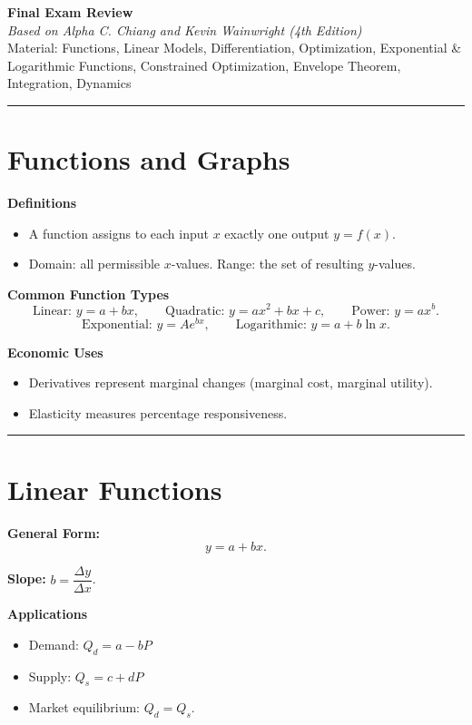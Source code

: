 \documentclass[12pt]{article}
\begin{document}
\begin{center}
    {\LARGE \textbf{Final Exam Review}}\\[4pt]
    \textit{Based on Alpha C. Chiang and Kevin Wainwright (4th Edition)}\\[4pt]
    Material: Functions, Linear Models, Differentiation, Optimization, Exponential \& Logarithmic Functions, Constrained Optimization, Envelope Theorem, Integration, Dynamics
\end{center}

\hrule
\vspace{10pt}

\section*{Functions and Graphs}

\textbf{Definitions}
\begin{itemize}
    \item A function assigns to each input \(x\) exactly one output \(y=f(x)\).
    \item Domain: all permissible \(x\)-values. Range: the set of resulting \(y\)-values.
\end{itemize}

\textbf{Common Function Types}
\[
\text{Linear: }y=a+bx,\qquad
\text{Quadratic: }y=ax^2+bx+c,\qquad
\text{Power: }y=ax^b.
\]
\[
\text{Exponential: }y=Ae^{bx},\qquad
\text{Logarithmic: }y=a+b\ln x.
\]

\textbf{Economic Uses}
\begin{itemize}
    \item Derivatives represent marginal changes (marginal cost, marginal utility).
    \item Elasticity measures percentage responsiveness.
\end{itemize}

\hrule
\vspace{10pt}

\section*{Linear Functions}

\textbf{General Form:}
\[
y = a + bx.
\]

\textbf{Slope:} \(b=\dfrac{\Delta y}{\Delta x}\).

\textbf{Applications}
\begin{itemize}
    \item Demand: \(Q_d=a-bP\)
    \item Supply: \(Q_s=c+dP\)
    \item Market equilibrium: \(Q_d=Q_s\).
\end{itemize}
\end{document}
